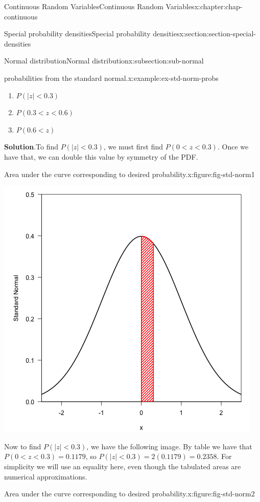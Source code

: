 \documentclass[oneside,10pt,]{book}
\newcommand{\blocktitlefont}{\relax}
\newcommand{\lt}{<}
\begin{document}
\begin{chapterptx}{Continuous Random Variables}{}{Continuous Random Variables}{}{}{x:chapter:chap-continuous}
\begin{sectionptx}{Special probability densities}{}{Special probability densities}{}{}{x:section:section-special-densities}
\begin{subsectionptx}{Normal distribution}{}{Normal distribution}{}{}{x:subsection:sub-normal}
\begin{example}{probabilities from the standard normal.}{x:example:ex-std-norm-probs}
\begin{enumerate}
\item{}\(\displaystyle P(|z|\lt 0.3)\)%
\item{}\(\displaystyle P(0.3 \lt z \lt 0.6)\)%
\item{}\(\displaystyle P(0.6 \lt z)\)%
\end{enumerate}
%
\textbf{\blocktitlefont Solution}.\quad{}To find \(P(|z|\lt 0.3)\), we must first find \(P(0 \lt z \lt
0.3)\). Once we have that, we can double this value by symmetry of the PDF.%
\begin{figureptx}{Area under the curve corresponding to desired probability.}{x:figure:fig-std-norm1}{}%
\begin{image}{0.25}{0.5}{0.25}%
\includegraphics[width=\linewidth]{./images/std_norm1.png}
\end{image}%
\tcblower
\end{figureptx}%
Now to find \(P(|z|\lt 0.3)\), we have the following image. By table we have that \(P(0 \lt z \lt 0.3) = 0.1179\), so \(P(|z|\lt 0.3) = 2(0.1179) = 0.2358\).  For simplicity we will use an equality here, even though the tabulated areas are numerical approximations.%
\begin{figureptx}{Area under the curve corresponding to desired probability.}{x:figure:fig-std-norm2}{}%
\begin{image}{0.25}{0.5}{0.25}%

\end{image}
\end{figureptx}
\end{example}
\end{subsectionptx}
\end{sectionptx}
\end{chapterptx}
\end{document}
